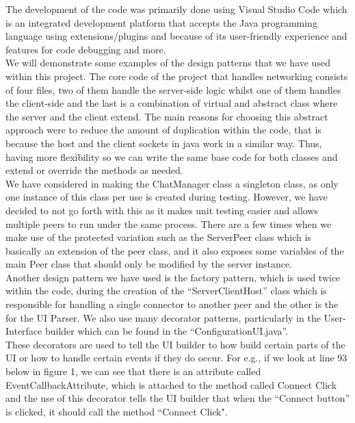 \documentclass{COMPXXXX}
\begin{document}
\normalsize \textrm {The development of the code was primarily done using Visual Studio Code which is an integrated development platform that accepts the Java programming language using extensions/plugins and because of its user-friendly experience and features for code debugging and more.\\
We will demonstrate some examples of the design patterns that we have used within this project. The core code of the project that handles networking  consists of four files, two of them handle the server-side logic whilst one of them handles the client-side and the last is a combination of virtual and abstract class where the server and the client extend. The main reasons for choosing this abstract approach were to reduce the amount of duplication within the code, that is because the host and the client sockets in java work in a similar way. Thus, having more flexibility so we can write the same base code for both classes and extend or override the methods as needed.\\
We have considered in making the ChatManager class a singleton class, as only one instance of this class per use is created during testing. However, we have decided to not go forth with this as it makes unit testing easier and allows multiple peers to run under the same process. There are a few times when we make use of the protected variation such as the ServerPeer class which is basically an extension of the peer class, and it also exposes some variables of the main Peer class that should only be modified by the server instance.\\
Another design pattern we have used is the factory pattern, which is used twice within the code, during the creation of the “ServerClientHost” class which is responsible for handling a single connector to another peer and the other is the for the UI Parser. We also use many decorator patterns, particularly in the User-Interface builder which can be found in the “ConfigurationUI.java”.\\
These decorators are used to tell the UI builder to how build certain parts of the UI or how to handle certain events if they do occur. For e.g., if we look at line 93 below in figure 1, we can see that there is an attribute called EventCallbackAttribute, which is attached to the method called Connect Click and the use of this decorator tells the UI builder that when the “Connect button” is clicked, it should call the method “Connect Click".}\\
\end{document}
